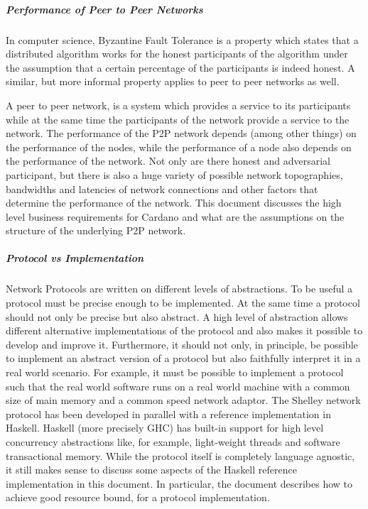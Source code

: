 \documentclass{report}
\theoremstyle{definition}{
  \newtheorem{lemma}{Lemma}[section] %
  \newtheorem{definition}[lemma]{Definition}
}
\theoremstyle{theorem}{
  \newtheorem{invariant}[lemma]{Invariant}
  \newtheorem{proofobligation}[lemma]{Proof Obligation}
}
\numberwithin{equation}{lemma}
\begin{document}

\subparagraph{Performance of Peer to Peer Networks}
In computer science, Byzantine Fault Tolerance is a property which states
that a distributed algorithm works for the honest participants of the algorithm
under the assumption that a certain percentage of the participants is indeed honest.
A similar, but more informal property applies to peer to peer networks as well.

A peer to peer network, is a system which provides a service to its participants while at the same
time the participants of the network provide a service to the network.
The performance of the P2P network depends (among other things) on the performance of the nodes,
while the performance of a node also depends on the performance of the network.
Not only are there honest and adversarial participant, but there is also a huge variety of
possible network topographies, bandwidths and latencies of network connections and other
factors that determine the performance of the network.
This document discusses the high level business requirements for Cardano and what are the
assumptions on the structure of the underlying P2P network.

\subparagraph{Protocol vs Implementation}
Network Protocols are written on different levels of abstractions.
To be useful a protocol must be precise enough to be implemented.
At the same time a protocol should not only be precise but also abstract.
A high level of abstraction allows different alternative implementations of the protocol
and also makes it possible to develop and improve it.
Furthermore, it should not only, in principle, be possible to implement an
abstract version of a protocol
but also faithfully interpret it in a real world scenario.
For example, it must be possible to implement a protocol
such that the real world software runs on a real world machine with a common size of main memory
and a common speed network adaptor.
The Shelley network protocol has been developed in parallel with a reference implementation in Haskell.
Haskell (more precisely GHC) has built-in support for high level concurrency abstractions
like, for example, light-weight threads and software transactional memory.
While the protocol itself is completely language agnostic, it still makes sense to discuss some
aspects of the Haskell reference implementation in this document.
In particular, the document describes how to achieve good resource bound, for
a protocol implementation.
\end{document}
